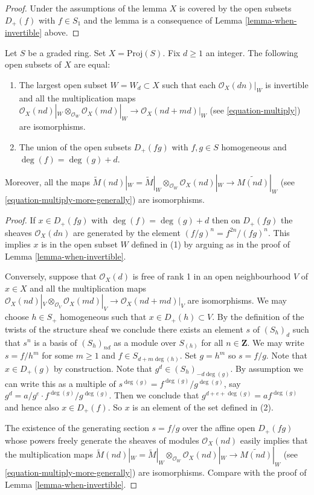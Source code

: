 \begin{proof}
Under the assumptions of the lemma $X$ is covered by the
open subsets $D_{+}(f)$ with $f \in S_1$ and the
lemma is a consequence of Lemma \ref{lemma-when-invertible} above.
\end{proof}

\begin{lemma}
\label{lemma-where-invertible}
Let $S$ be a graded ring. Set $X = \text{Proj}(S)$. Fix $d \geq 1$ an
integer. The following open subsets of $X$ are equal:
\begin{enumerate}
\item The largest open subset $W = W_d \subset X$ such that
each $\mathcal{O}_X(dn)|_W$ is invertible and all the
multiplication maps
$\mathcal{O}_X(nd)|_W \otimes_{\mathcal{O}_W} \mathcal{O}_X(md)|_W
\to \mathcal{O}_X(nd + md)|_W$
(see \ref{equation-multiply}) are isomorphisms.
\item The union of the open subsets $D_{+}(fg)$ with
$f, g \in S$ homogeneous and $\deg(f) = \deg(g) + d$.
\end{enumerate}
Moreover, all the maps
$\widetilde M(nd)|_W = \widetilde M|_W \otimes_{\mathcal{O}_W}
\mathcal{O}_X(nd)|_W \to \widetilde{M(nd)}|_W$
(see \ref{equation-multiply-more-generally}) are isomorphisms.
\end{lemma}

\begin{proof}
If $x \in D_{+}(fg)$ with $\deg(f) = \deg(g) + d$ then
on $D_{+}(fg)$ the sheaves $\mathcal{O}_X(dn)$
are generated by the element $(f/g)^n = f^{2n}/(fg)^n$. This implies $x$
is in the open subset $W$ defined in (1) by arguing as in the
proof of Lemma \ref{lemma-when-invertible}.

\medskip\noindent
Conversely, suppose that $\mathcal{O}_X(d)$ is free of rank 1
in an open neighbourhood $V$ of $x \in X$ and all the
multiplication maps
$\mathcal{O}_X(nd)|_V \otimes_{\mathcal{O}_V} \mathcal{O}_X(md)|_V
\to \mathcal{O}_X(nd + md)|_V$ are isomorphisms.
We may choose $h \in S_{+}$ homogeneous such that $x \in D_{+}(h) \subset V$.
By the definition of the twists of the structure sheaf we conclude there
exists an element $s$ of $(S_h)_d$ such that $s^n$ is a basis of $(S_h)_{nd}$
as a module over $S_{(h)}$ for all $n \in \mathbf{Z}$.
We may write
$s = f/h^m$ for some $m \geq 1$ and $f \in S_{d + m \deg(h)}$.
Set $g = h^m$ so $s = f/g$. Note that $x \in D_{+}(g)$ by construction.
Note that $g^d \in (S_h)_{-d\deg(g)}$.
By assumption we can write this as a multiple of
$s^{\deg(g)} = f^{\deg(g)}/g^{\deg(g)}$, say
$g^d = a/g^e \cdot f^{\deg(g)}/g^{\deg(g)}$.
Then we conclude that $g^{d + e + \deg(g)} = a f^{\deg(g)}$
and hence also $x \in D_{+}(f)$. So $x$ is an element of the set defined
in (2).

\medskip\noindent
The existence of the generating section $s = f/g$ over
the affine open $D_{+}(fg)$ whose
powers freely generate the sheaves of modules
$\mathcal{O}_X(nd)$ easily implies that the multiplication maps
$\widetilde M(nd)|_W = \widetilde M|_W \otimes_{\mathcal{O}_W}
\mathcal{O}_X(nd)|_W \to \widetilde{M(nd)}|_W$
(see \ref{equation-multiply-more-generally})
are isomorphisms. Compare with the proof of Lemma \ref{lemma-when-invertible}.
\end{proof}

